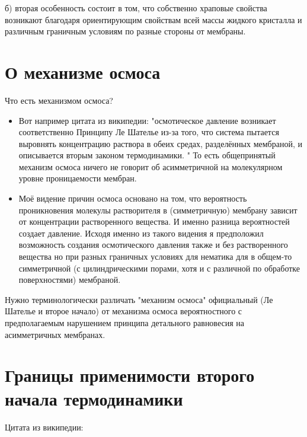 \documentclass[11pt]{article}
\begin{document}
б) вторая особенность состоит в том, что собственно храповые свойства
возникают благодаря ориентирующим свойствам всей массы жидкого кристалла
и различным граничным условиям по разные стороны от мембраны.

    \section{О механизме
осмоса}\label{ux43e-ux43cux435ux445ux430ux43dux438ux437ux43cux435-ux43eux441ux43cux43eux441ux430}

    Что есть механизмом осмоса?

\begin{itemize}
\item
  Вот например цитата из википедии: "осмотическое давление возникает
  соответственно Принципу Ле Шателье из-за того, что система пытается
  выровнять концентрацию раствора в обеих средах, разделённых мембраной,
  и описывается вторым законом термодинамики. " То есть общепринятый
  механизм осмоса ничего не говорит об асимметричной на молекулярном
  уровне проницаемости мембран.
\item
  Моё видение причин осмоса основано на том, что вероятность
  проникновения молекулы растворителя в (симметричную) мембрану зависит
  от концентрации растворенного вещества. И именно разница вероятностей
  создает давление. Исходя именно из такого видения я предположил
  возможность создания осмотического давления также и без растворенного
  вещества но при разных граничных условиях для нематика для в общем-то
  симметричной (с цилиндрическими порами, хотя и с различной по
  обработке поверхностями) мембраной.
\end{itemize}

Нужно терминологически различать "механизм осмоса" официальный (Ле
Шателье и второе начало) от механизма осмоса вероятностного с
предполагаемым нарушением принципа детального равновесия на
асимметричных мембранах.

    \section{Границы применимости второго начала
термодинамики}\label{ux433ux440ux430ux43dux438ux446ux44b-ux43fux440ux438ux43cux435ux43dux438ux43cux43eux441ux442ux438-ux432ux442ux43eux440ux43eux433ux43e-ux43dux430ux447ux430ux43bux430-ux442ux435ux440ux43cux43eux434ux438ux43dux430ux43cux438ux43aux438}

    Цитата из википедии:
\end{document}
